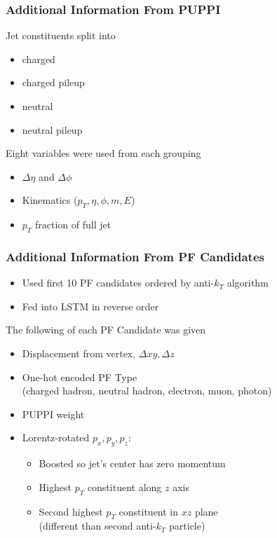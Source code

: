 \documentclass{beamer}
\begin{document}
\begin{frame}
  \frametitle{Additional Information From PUPPI}

  Jet constituents split into

  \begin{itemize}
  \item charged
  \item charged pileup
  \item neutral
  \item neutral pileup
  \end{itemize}

  Eight variables were used from each grouping 

  \begin{itemize}
  \item $\Delta \eta$ and $\Delta \phi$
  \item Kinematics ($p_T, \eta, \phi, m, E$)
  \item $p_T$ fraction of full jet
  \end{itemize}

\end{frame}

\begin{frame}
  \frametitle{Additional Information From PF Candidates}

  \begin{itemize}
  \item Used first 10 PF candidates ordered by anti-$k_T$ algorithm
  \item Fed into LSTM in reverse order
  \end{itemize}

  The following of each PF Candidate was given

  \begin{itemize}
  \item Displacement from vertex, $\Delta xy, \Delta z$
  \item One-hot encoded PF Type \\
    (charged hadron, neutral hadron, electron, muon, photon)
  \item PUPPI weight
  \item Lorentz-rotated $p_x, p_y, p_z$:
    \begin{itemize}
    \item Boosted so jet's center has zero momentum
    \item Highest $p_T$ constituent along $z$ axis
    \item Second highest $p_T$ constituent in $xz$ plane \\
      (different than second anti-$k_T$ particle)
    \end{itemize}
  \end{itemize}

\end{frame}
\end{document}
